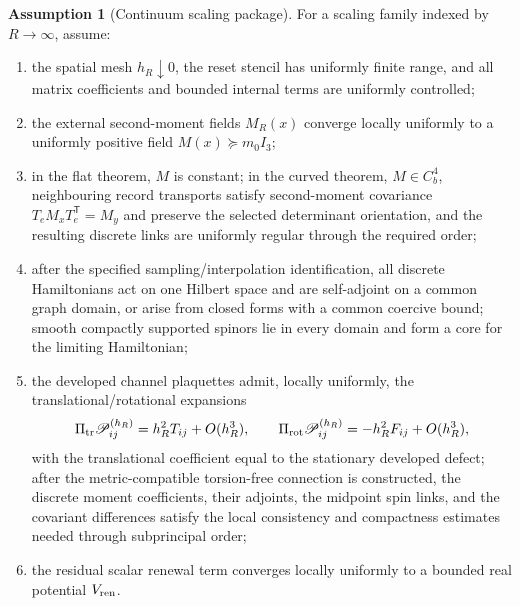 \documentclass[11pt]{article}
\theoremstyle{definition}
\newtheorem{assumption}[theorem]{Assumption}
\theoremstyle{remark}
\begin{document}
\begin{assumption}[Continuum scaling package]
\label{ass:scaling-package}
For a scaling family indexed by $R\to\infty$, assume:
\begin{enumerate}[label=\textup{(A\arabic*)},leftmargin=3em]
\item the spatial mesh $h_R\downarrow0$, the reset stencil has uniformly finite
      range, and all matrix coefficients and bounded internal terms are
      uniformly controlled;
\item the external second-moment fields $M_R(x)$ converge locally uniformly to
      a uniformly positive field $M(x)\succeq m_0 I_3$;
\item in the flat theorem, $M$ is constant; in the curved theorem,
      $M\in C_b^4$, neighbouring record transports satisfy second-moment
      covariance $T_eM_xT_e^{\mathsf T}=M_y$ and preserve the selected
      determinant orientation, and the resulting discrete links are uniformly
      regular through the required order;
\item after the specified sampling/interpolation identification, all discrete
      Hamiltonians act on one Hilbert space and are self-adjoint on a common
      graph domain, or arise from closed forms with a common coercive bound;
      smooth compactly supported spinors lie in every domain and form a core for
      the limiting Hamiltonian;
\item the developed channel plaquettes admit, locally uniformly, the
      translational/rotational expansions
      \[
        \Pi_{\rm tr}\mathscr P_{ij}^{(h_R)}
        =h_R^2T_{ij}+O(h_R^3),
        \qquad
        \Pi_{\rm rot}\mathscr P_{ij}^{(h_R)}
        =-h_R^2F_{ij}+O(h_R^3),
      \]
      with the translational coefficient equal to the stationary developed
      defect; after the metric-compatible torsion-free connection is
      constructed, the discrete moment coefficients, their adjoints, the
      midpoint spin links, and the covariant differences satisfy the local
      consistency and compactness estimates needed through subprincipal order;
\item the residual scalar renewal term converges locally uniformly to a bounded
      real potential $V_{\rm ren}$.
\end{enumerate}
\end{assumption}
\end{document}
